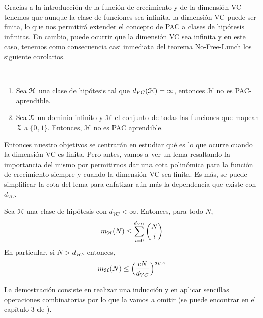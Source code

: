     
    Gracias a la introducción de la función de crecimiento y de la dimensión VC tenemos que aunque la clase de funciones sea infinita, la dimensión VC puede ser finita, lo que nos permitirá extender el concepto de PAC a clases de hipótesis infinitas. En cambio, puede ocurrir que la dimensión VC sea infinita y en este caso, tenemos como consecuencia casi inmediata del teorema No-Free-Lunch los siguiente corolarios. \\
    
    \begin{corolario} ~\smallskip
    \begin{enumerate}
    
    \item Sea $\mathcal{H}$ una clase de hipótesis tal que $d_{VC}(\mathcal{H}) = \infty$, entonces $\mathcal{H}$ no es PAC-aprendible.
    \item Sea $\mathcal{X}$ un dominio infinito y $\mathcal{H}$ el conjunto de todas las funciones que mapean $\mathcal{X}$ a $\{0,1\}$. Entonces, $\mathcal{H}$ no es PAC aprendible. 
   
    \end{enumerate}
    \end{corolario}
    
    Entonces nuestro objetivos se centrarán en estudiar qué es lo que ocurre cuando la dimensión VC es finita. Pero antes, vamos a ver un lema resaltando la importancia del mismo por permitirnos dar una cota polinómica para la función de crecimiento siempre y cuando la dimensión VC sea finita. Es más, se puede simplificar la cota del lema para enfatizar aún más la dependencia que existe con $d_{VC}$. \\ 
    
    \begin{lema}\label{lema:Sauer}
    Sea $\mathcal{H}$ una clase de hipótesis con $d_{VC} < \infty$. Entonces, para todo $N$, 
    \begin{equation}
    m_{\mathcal{H}}(N) \leq \sum_{i=0}^{d_{VC}} \binom{N}{i}
    \end{equation}
    \noindent En particular, si $N > d_{VC} $, entonces,
    \begin{equation}
        m_{\mathcal{H}}(N) \leq \Big( \frac{e N }{d_{VC}} \Big)^{d_{VC}}
    \end{equation}
    \end{lema}
    
    La demostración consiste en realizar una inducción y en aplicar sencillas operaciones combinatorias por lo que la vamos a omitir (se puede encontrar en el capítulo 3 de \cite{FML}). \\
    

